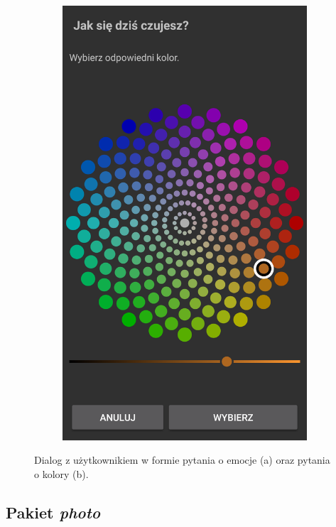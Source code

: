 \begin{figure}[H]
\begin{subfigure}{0.35\textwidth}
		\includegraphics[scale=0.13]{rozdzial3/screen-color.png}
		\subcaption{\label{subfigure_b}}
	\end{subfigure}
	\caption{ Dialog z użytkownikiem w formie pytania o emocje (a) oraz pytania o kolory (b).}
\end{figure}


\subsection{Pakiet \textit{photo}}

